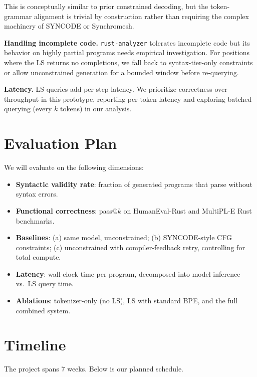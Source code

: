 \documentclass[11pt,letterpaper]{article}
\begin{document}
This is conceptually similar to prior constrained decoding, but the token-grammar alignment is trivial by construction rather than requiring the complex machinery of SYNCODE or Synchromesh.

\textbf{Handling incomplete code.}
\texttt{rust-analyzer} tolerates incomplete code but its behavior on highly partial programs needs empirical investigation. For positions where the LS returns no completions, we fall back to syntax-tier-only constraints or allow unconstrained generation for a bounded window before re-querying.

\textbf{Latency.}
LS queries add per-step latency. We prioritize correctness over throughput in this prototype, reporting per-token latency and exploring batched querying (every $k$ tokens) in our analysis.

\section{Evaluation Plan}

We will evaluate on the following dimensions:

\begin{itemize}[leftmargin=*,itemsep=2pt]
  \item \textbf{Syntactic validity rate}: fraction of generated programs that parse without syntax errors.
  \item \textbf{Functional correctness}: pass@$k$ on HumanEval-Rust and MultiPL-E Rust benchmarks.
  \item \textbf{Baselines}: (a) same model, unconstrained; (b) SYNCODE-style CFG constraints; (c) unconstrained with compiler-feedback retry, controlling for total compute.
  \item \textbf{Latency}: wall-clock time per program, decomposed into model inference vs.\ LS query time.
  \item \textbf{Ablations}: tokenizer-only (no LS), LS with standard BPE, and the full combined system.
\end{itemize}

\section{Timeline}

The project spans 7 weeks. Below is our planned schedule.
\end{document}
